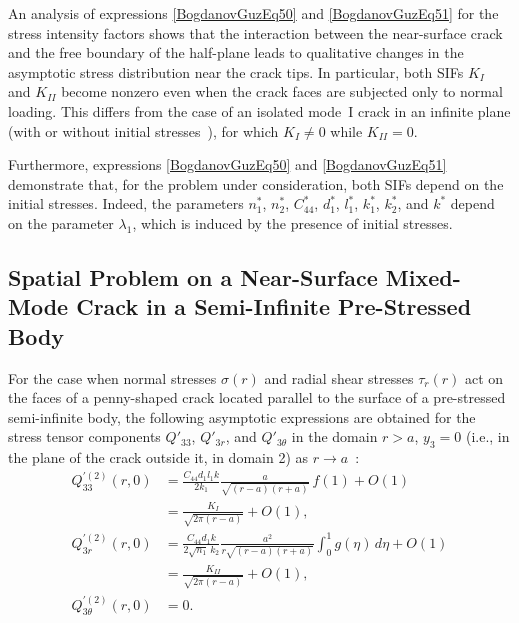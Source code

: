 An analysis of expressions \eqref{BogdanovGuzEq50} and
\eqref{BogdanovGuzEq51} for the stress intensity factors shows that the
interaction between the near-surface crack and the free boundary of the
half-plane leads to qualitative changes in the asymptotic stress distribution
near the crack tips. In particular, both SIFs $K_{I}$ and $K_{II}$ become
nonzero even when the crack faces are subjected only to normal loading.
This differs from the case of an isolated mode~I crack in an infinite plane
(with or without initial stresses~\cite{BogdanovGuz27,BogdanovGuz16}),
for which $K_{I}\neq 0$ while $K_{II}=0$.

Furthermore, expressions \eqref{BogdanovGuzEq50} and
\eqref{BogdanovGuzEq51} demonstrate that, for the problem under
consideration, both SIFs depend on the initial stresses. Indeed, the
parameters $n_{1}^{*}$, $n_{2}^{*}$, $C_{44}^{*}$, $d_{1}^{*}$, $l_{1}^{*}$,
$k_{1}^{*}$, $k_{2}^{*}$, and $k^{*}$ depend on the parameter $\lambda_{1}$,
which is induced by the presence of initial stresses.

\subsection{Spatial Problem on a Near-Surface Mixed-Mode Crack in a Semi-Infinite Pre-Stressed Body}

For the case when normal stresses $\sigma(r)$ and radial shear stresses
$\tau_r(r)$ act on the faces of a penny-shaped crack located parallel to the
surface of a pre-stressed semi-infinite body, the following asymptotic
expressions are obtained for the stress tensor components
$Q'_{33}$, $Q'_{3r}$, and $Q'_{3\theta}$ in the domain $r>a$, $y_{3}=0$
(i.e., in the plane of the crack outside it, in domain 2) as
$r\to a$~\cite{BogdanovGuz32}:
\begin{equation}
	\label{BogdanovGuzEq52}
	\begin{aligned}
		Q_{33}^{\prime(2)}(r,0)
		&=
			\frac{C_{44} d_{1} l_{1} k}{2k_{1}}
			\frac{a}{\sqrt{(r-a)(r+a)}}\,f(1)
			+O(1)
			\\
			&=
			\frac{K_{I}}{\sqrt{2\pi (r-a)}}+O(1),
		\\
		Q_{3r}^{\prime(2)}(r,0)
		&=
		\frac{C_{44} d_{1} k}{2\sqrt{n_{1}}\,k_{2}}
			\frac{a^{2}}{r\sqrt{(r-a)(r+a)}}
			\int_{0}^{1} g(\eta)\,d\eta
			+O(1)
			\\
			&=
			\frac{K_{II}}{\sqrt{2\pi (r-a)}}+O(1),
		\\
		Q_{3\theta}^{\prime(2)}(r,0)
		&=
		0 .		
	\end{aligned}
\end{equation}

